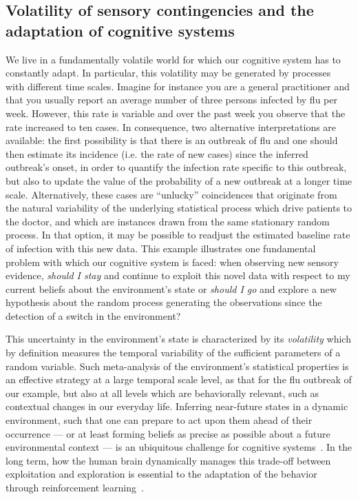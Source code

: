 \documentclass[10pt,letterpaper]{article}
\newcommand{\citep}[1]{\cite{#1}}
\newcommand{\LP}[1]{\textbf{\textcolor{red}{[LP: #1]}}}
\newcommand{\Rone}[1]{\textbf{\textcolor{magenta}{[rev 1: #1]}}}
\begin{document}
\subsection*{Volatility of sensory contingencies and the adaptation of cognitive systems}
We live in a fundamentally volatile world for which
our cognitive system has to constantly adapt.
In particular, this volatility may be generated
by processes with different time scales.
Imagine for instance you are a general practitioner and
that you usually report an average number of
three persons infected by flu per week.
However, this rate is variable and
over the past week you observe that the rate increased to ten cases.
In consequence, two alternative interpretations are available:
the first possibility is that there is an outbreak of flu and
one should then estimate its incidence
(i.e. the rate of new cases)
since the inferred outbreak's onset, in order
to quantify the infection rate specific to this outbreak,
but also to update the value of %
the probability of a new outbreak %
at a longer time scale.
Alternatively, these cases are
``unlucky'' coincidences that originate from the natural variability
of the underlying statistical process which drive patients to the doctor,
and which are instances drawn from the same stationary random process.
In that option, it may be possible to readjust
the estimated baseline rate of infection with this new data.
This example illustrates one fundamental problem
with which our cognitive system is faced:
when observing new sensory evidence,
\emph{should I stay} and continue to exploit this novel data
with respect to my current beliefs about the environment's state
or \emph{should I go} and explore a new hypothesis
about the random process generating the observations
since the detection of a switch in the environment?

This uncertainty in the environment's state is characterized by its \emph{volatility}
which by definition measures the temporal variability
of the sufficient parameters of a random variable.
Such meta-analysis of the environment's statistical properties
is an effective strategy at a large temporal scale level,
as that for the flu outbreak of our example,
but also at all levels which are behaviorally relevant,
such as contextual changes in our everyday life.
Inferring near-future states in a dynamic environment,
such that one can prepare to act upon them
ahead of their occurrence ---
or at least forming beliefs as precise as possible
about a future environmental context ---
is an ubiquitous challenge for cognitive systems~\citep{Barack16}.
In the long term, how the human brain dynamically manages
this trade-off between exploitation and exploration
is essential to the adaptation
of the behavior through reinforcement learning~\citep{Cohen2007}.
\end{document}
